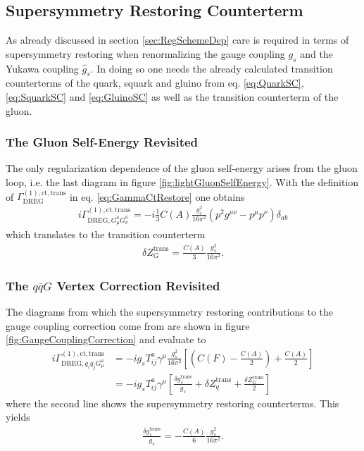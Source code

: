 \subsection{Supersymmetry Restoring Counterterm}\label{sec:SUSYrestore}
As already discussed in section \ref{sec:RegSchemeDep} care is required in terms of supersymmetry restoring when renormalizing  the gauge coupling $g_s$ and the Yukawa coupling $\hat{g}_s$. In doing so one needs the already calculated transition counterterms of the quark, squark and gluino from eq. \eqref{eq:QuarkSC}, \eqref{eq:SquarkSC} and \eqref{eq:GluinoSC}
as well as the transition counterterm of the gluon.
\subsubsection*{The Gluon Self-Energy Revisited}
The only regularization dependence of the gluon self-energy arises from the gluon loop, i.e. the last diagram in figure \ref{fig:lightGluonSelfEnergy}. With the definition of $\Gamma^{\mathrm{(1),ct,trans}}_{\mathrm{DREG}}$ in eq. \eqref{eq:GammaCtRestore} one obtains
\begin{align}
i\Gamma^{\mathrm{(1),ct,trans}}_{\mathrm{DREG},G_\mu^a G_\nu^b} = -i\frac{1}{3} C(A) \frac{g_s^2}{16\pi^2}(p^2 g^{\mu\nu}-p^\mu p^\nu)\delta_{ab}
\end{align}
which translates to the transition counterterm
\begin{align}
\delta Z^{\mathrm{trans}}_G = \frac{C(A)}{3}\frac{g_s^2}{16\pi^2}.
\end{align}

\subsubsection*{The $q\overline{q}G$ Vertex Correction Revisited}
The diagrams from which the supersymmetry restoring contributions to the gauge coupling correction come from are shown in figure \ref{fig:GaugeCouplingCorrection} and evaluate to
\begin{align}
i\Gamma^{\mathrm{(1),ct,trans}}_{\mathrm{DREG}, q_i\overline{q}_jG_\mu^a} &= -ig_s T^a_{ij} \gamma^\mu \frac{g_s^2}{16\pi^2}\left[ \left( C(F) - \frac{C(A)}{2} \right) + \frac{C(A)}{2} \right]\\
&= -ig_s T^a_{ij} \gamma^\mu \left[ \frac{\delta g_s^{\mathrm{trans}}}{g_s} + \delta Z^{\mathrm{trans}}_q + \frac{\delta Z^{\mathrm{trans}}_G}{2} \right]
\end{align}
where the second line shows the supersymmetry restoring counterterms. This yields
\begin{align}
\frac{\delta g_s^{\mathrm{trans}}}{g_s} = -\frac{C(A)}{6} \frac{g_s^2}{16\pi^2}.
\end{align}

